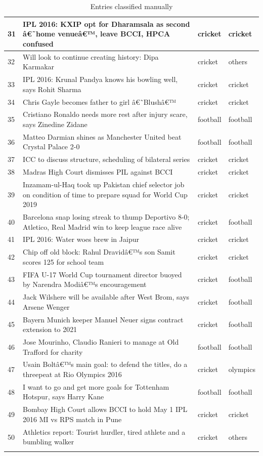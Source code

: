\documentclass[12pt]{article}
\begin{document}
\begin{longtable}{ |p{2.0cm} | p{10.0cm} | p{2.0cm} |p{2.0cm}| }
31 &  IPL 2016: KXIP opt for Dharamsala as second â€˜home venueâ€™, leave BCCI, HPCA confused & cricket & cricket \\\hline										
32 &  Will look to continue creating history: Dipa Karmakar & cricket & others \\\hline										
33 &  IPL 2016: Krunal Pandya knows his bowling well, says Rohit Sharma & cricket & cricket \\\hline										
34 &  Chris Gayle becomes father to girl â€˜Blushâ€™ & cricket & cricket \\\hline										
35 &  Cristiano Ronaldo needs more rest after injury scare, says Zinedine Zidane & football & football \\\hline										
36 &  Matteo Darmian shines as Manchester United beat Crystal Palace 2-0 & football & football \\\hline										
37 &  ICC to discuss structure, scheduling of bilateral series & cricket & cricket \\\hline										
38 &  Madras High Court dismisses PIL against BCCI & cricket & cricket \\\hline										
39 &  Inzamam-ul-Haq took up Pakistan chief selector job on condition of time to prepare squad for World Cup 2019 & cricket & cricket \\\hline										
40 &  Barcelona snap losing streak to thump Deportivo 8-0; Atletico, Real Madrid win to keep league race alive & cricket & football \\\hline										
41 &  IPL 2016: Water woes brew in Jaipur & cricket & cricket \\\hline										
42 &  Chip off old block: Rahul Dravidâ€™s son Samit scores 125 for school team & cricket & cricket \\\hline										
43 &  FIFA U-17 World Cup tournament director buoyed by Narendra Modiâ€™s encouragement & cricket & football \\\hline										
44 &  Jack Wilshere will be available after West Brom, says Arsene Wenger & cricket & football \\\hline										
45 &  Bayern Munich keeper Manuel Neuer signs contract extension to 2021 & cricket & football \\\hline										
46 &  Jose Mourinho, Claudio Ranieri to manage at Old Trafford for charity & football & football \\\hline										
47 &  Usain Boltâ€™s main goal: to defend the titles, do a threepeat at Rio Olympics 2016 & cricket & olympics \\\hline										
48 &  I want to go and get more goals for Tottenham Hotspur, says Harry Kane & football & football \\\hline										
49 &  Bombay High Court allows BCCI to hold May 1 IPL 2016 MI vs RPS match in Pune & cricket & cricket \\\hline										
50 &  Athletics report: Tourist hurdler, tired athlete and a bumbling walker & cricket & others \\\hline										

 \caption{Entries classified manually}
\end{longtable}
\end{document}
